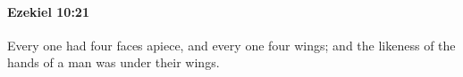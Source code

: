 
		\paragraph{Ezekiel 10:21} %
			\label{EZEKIEL-10-21}

			Every one had four faces apiece, and every one four wings; and the likeness of the hands of a man was under their wings.


